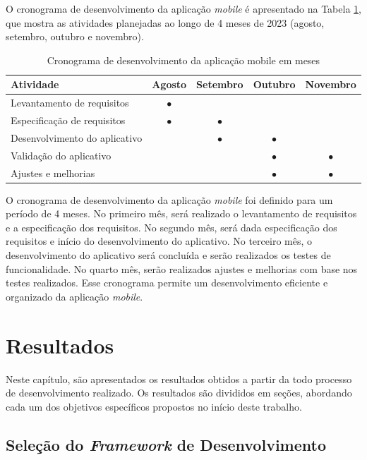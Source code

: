 \documentclass[
    12pt,                   %
    openright,              %
    oneside,                %
    a4paper,                %
    sumario=tradicional,    %
    english,                %
    brazil,                 %
    ]{abntex2}
\begin{document}
O cronograma de desenvolvimento da aplicação \textit{mobile} é apresentado na Tabela \ref{tab:cronograma}, que mostra as atividades planejadas ao longo de 4 meses de 2023 (agosto, setembro, outubro e novembro).

\begin{table}[htbp]
  \centering
  \caption{Cronograma de desenvolvimento da aplicação mobile em meses}
  \label{tab:cronograma}
  \begin{tabular}{lcccc}
    \toprule
    \textbf{Atividade} & \textbf{Agosto} & \textbf{Setembro} & \textbf{Outubro} & \textbf{Novembro} \\
    \midrule
    Levantamento de requisitos & $\bullet$ & & & \\
    Especificação de requisitos & $\bullet$ & $\bullet$ & & \\
    Desenvolvimento do aplicativo & & $\bullet$ & $\bullet$ \\
    Validação do aplicativo & & & $\bullet$ & $\bullet$ \\
    Ajustes e melhorias & & & $\bullet$ & $\bullet$ \\
    \bottomrule
  \end{tabular}
\end{table}

O cronograma de desenvolvimento da aplicação \textit{mobile} foi definido para um período de 4 meses. No primeiro mês, será realizado o levantamento de requisitos e a especificação dos requisitos. No segundo mês, será dada especificação dos requisitos e início do desenvolvimento do aplicativo. No terceiro mês, o desenvolvimento do aplicativo será concluída e serão realizados os testes de funcionalidade. No quarto mês, serão realizados ajustes e melhorias com base nos testes realizados. Esse cronograma permite um desenvolvimento eficiente e organizado da aplicação \textit{mobile}.

\newpage

\chapter{Resultados}
\label{chap:resultados}

    Neste capítulo, são apresentados os resultados obtidos a partir da todo processo de desenvolvimento realizado. Os resultados são divididos em seções, abordando cada um dos objetivos específicos propostos no início deste trabalho.
    
    \section{Seleção do \textit{Framework} de Desenvolvimento}
    \label{sec:selecao-framework}
    
\end{document}
